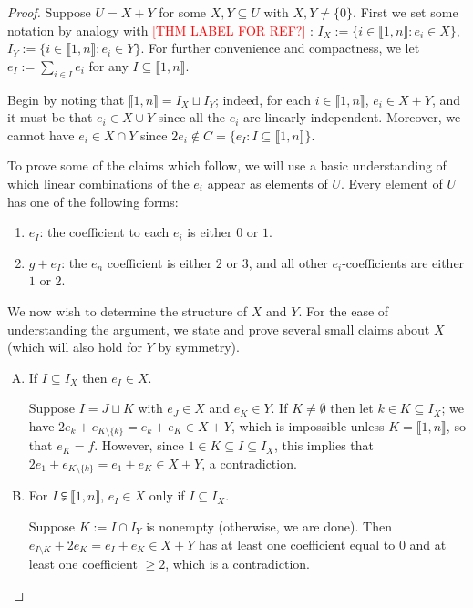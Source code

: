 \documentclass{report}
\newcommand{\llb}{\llbracket}
\newcommand{\rrb}{\rrbracket}
\renewcommand{\:}{\text{:}}
\theoremstyle{definition}
\begin{document}
\begin{proof}
Suppose $U = X + Y$ for some $X,Y\subseteq U$ with $X,Y\neq \{0\}$.
First we set some notation by analogy with \textcolor{red}{[THM LABEL FOR REF?]} \cite{fan-al17}: $I_X := \{i\in \llb 1,n \rrb: e_i\in X\}$, $I_Y := \{i\in \llb1,n \rrb: e_i\in Y \}$.
For further convenience and compactness, we let $e_I := \sum_{i\in I}e_i$ for any $I\subseteq \llb 1,n \rrb$.

Begin by noting that $\llb 1,n \rrb = I_X \sqcup I_Y$; indeed, for each $i\in\llb 1,n \rrb$, $e_i\in X+Y$, and it must be that $e_i\in X\cup Y$ since all the $e_i$ are linearly independent.  
Moreover, we cannot have $e_i\in X\cap Y$ since $2e_i \notin C = \{e_I : I\subseteq \llb 1,n \rrb \}$.

To prove some of the claims which follow, we will use a basic understanding of which linear combinations of the $e_i$ appear as elements of $U$.
Every element of $U$ has one of the following forms:
\begin{enumerate}[(F1)]
\item $e_I$: the coefficient to each $e_i$ is either $0$ or $1$.
\item $g+e_I$: the $e_n$ coefficient is either $2$ or $3$, and all other $e_i$-coefficients are either $1$ or $2$.
\end{enumerate}

We now wish to determine the structure of $X$ and $Y$.
For the ease of understanding the argument, we state and prove several small claims about $X$ (which will also hold for $Y$ by symmetry).
\begin{enumerate}[(A)]
\item If $I\subseteq I_X$ then $e_I\in X$. 

Suppose $I = J\sqcup K$ with $e_J\in X$ and $e_K\in Y$.
If $K\neq \emptyset$ then let $k\in K\subseteq I_X$; we have $2e_k + e_{K\setminus\{k\}} = e_k + e_K\in X+Y$, which is impossible unless $K = \llb 1,n\rrb$, so that $e_K = f$.
However, since $1\in K\subseteq I\subseteq I_X$, this implies that $2e_1 + e_{K\setminus\{k\}} = e_1 + e_K\in X+Y$, a contradiction.

\item For $I\subsetneqq \llb 1,n \rrb$, $e_I\in X$ only if $I\subseteq I_X$.

Suppose $K := I \cap I_Y$ is nonempty (otherwise, we are done).
Then $e_{I\setminus K} + 2e_K = e_I + e_K \in X +Y$ has at least one coefficient equal to $0$ and at least one coefficient $\ge 2$, which is a contradiction.


\end{enumerate}
\end{proof}
\end{document}

